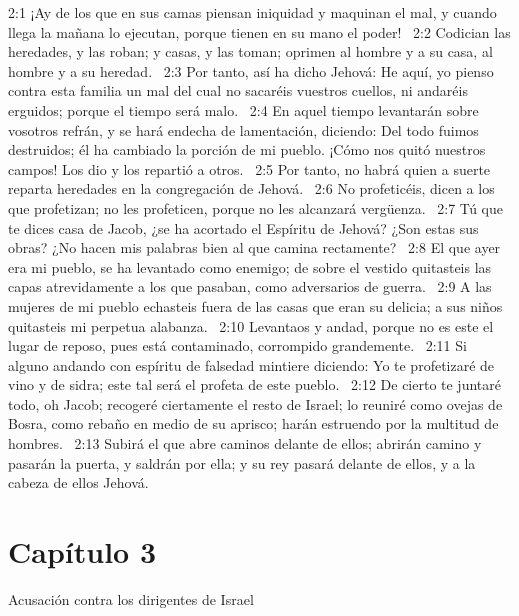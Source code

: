 2:1 ¡Ay de los que en sus camas piensan iniquidad y maquinan el mal, y cuando llega la mañana lo ejecutan, porque tienen en su mano el poder!  
2:2 Codician las heredades, y las roban; y casas, y las toman; oprimen al hombre y a su casa, al hombre y a su heredad.  
2:3 Por tanto, así ha dicho Jehová: He aquí, yo pienso contra esta familia un mal del cual no sacaréis vuestros cuellos, ni andaréis erguidos; porque el tiempo será malo.  
2:4 En aquel tiempo levantarán sobre vosotros refrán, y se hará endecha de lamentación, diciendo: Del todo fuimos destruidos; él ha cambiado la porción de mi pueblo. ¡Cómo nos quitó nuestros campos! Los dio y los repartió a otros.  
2:5 Por tanto, no habrá quien a suerte reparta heredades en la congregación de Jehová.  
2:6 No profeticéis, dicen a los que profetizan; no les profeticen, porque no les alcanzará vergüenza.  
2:7 Tú que te dices casa de Jacob, ¿se ha acortado el Espíritu de Jehová? ¿Son estas sus obras? ¿No hacen mis palabras bien al que camina rectamente?  
2:8 El que ayer era mi pueblo, se ha levantado como enemigo; de sobre el vestido quitasteis las capas atrevidamente a los que pasaban, como adversarios de guerra.  
2:9 A las mujeres de mi pueblo echasteis fuera de las casas que eran su delicia; a sus niños quitasteis mi perpetua alabanza.  
2:10 Levantaos y andad, porque no es este el lugar de reposo, pues está contaminado, corrompido grandemente.  
2:11 Si alguno andando con espíritu de falsedad mintiere diciendo: Yo te profetizaré de vino y de sidra; este tal será el profeta de este pueblo.  
2:12 De cierto te juntaré todo, oh Jacob; recogeré ciertamente el resto de Israel; lo reuniré como ovejas de Bosra, como rebaño en medio de su aprisco; harán estruendo por la multitud de hombres.  
2:13 Subirá el que abre caminos delante de ellos; abrirán camino y pasarán la puerta, y saldrán por ella; y su rey pasará delante de ellos, y a la cabeza de ellos Jehová.  
\section*{Capítulo 3 }
Acusación contra los dirigentes de Israel  

